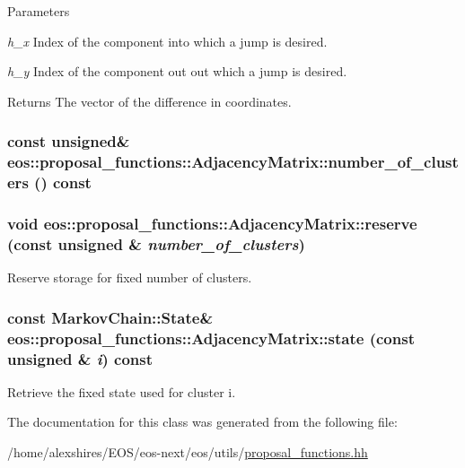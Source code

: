 \begin{DoxyParams}{Parameters}
\item[{\em h\_\-x}]Index of the component into which a jump is desired. \item[{\em h\_\-y}]Index of the component out out which a jump is desired. \end{DoxyParams}
\begin{DoxyReturn}{Returns}
The vector of the difference in coordinates. 
\end{DoxyReturn}
\hypertarget{classeos_1_1proposal__functions_1_1AdjacencyMatrix_aab2d5eddd479bc4065724a720db51079}{
\subsubsection[{number\_\-of\_\-clusters}]{\setlength{\rightskip}{0pt plus 5cm}const unsigned\& eos::proposal\_\-functions::AdjacencyMatrix::number\_\-of\_\-clusters () const}}
\label{classeos_1_1proposal__functions_1_1AdjacencyMatrix_aab2d5eddd479bc4065724a720db51079}
\hypertarget{classeos_1_1proposal__functions_1_1AdjacencyMatrix_aae7d3467e9159c0db5e17c31e02a2ba9}{
\subsubsection[{reserve}]{\setlength{\rightskip}{0pt plus 5cm}void eos::proposal\_\-functions::AdjacencyMatrix::reserve (const unsigned \& {\em number\_\-of\_\-clusters})}}
\label{classeos_1_1proposal__functions_1_1AdjacencyMatrix_aae7d3467e9159c0db5e17c31e02a2ba9}


Reserve storage for fixed number of clusters. \hypertarget{classeos_1_1proposal__functions_1_1AdjacencyMatrix_a1effea928a244e6250cb227087b4aafa}{
\subsubsection[{state}]{\setlength{\rightskip}{0pt plus 5cm}const {\bf MarkovChain::State}\& eos::proposal\_\-functions::AdjacencyMatrix::state (const unsigned \& {\em i}) const}}
\label{classeos_1_1proposal__functions_1_1AdjacencyMatrix_a1effea928a244e6250cb227087b4aafa}
Retrieve the fixed state used for cluster i. 

The documentation for this class was generated from the following file:\begin{DoxyCompactItemize}
\item 
/home/alexshires/EOS/eos-\/next/eos/utils/\hyperlink{proposal__functions_8hh}{proposal\_\-functions.hh}\end{DoxyCompactItemize}
